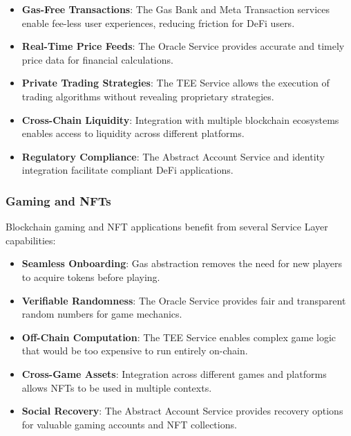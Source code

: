 \documentclass{article}
\begin{document}
\begin{itemize}
    \item \textbf{Gas-Free Transactions}: The Gas Bank and Meta Transaction services enable fee-less user experiences, reducing friction for DeFi users.
    
    \item \textbf{Real-Time Price Feeds}: The Oracle Service provides accurate and timely price data for financial calculations.
    
    \item \textbf{Private Trading Strategies}: The TEE Service allows the execution of trading algorithms without revealing proprietary strategies.
    
    \item \textbf{Cross-Chain Liquidity}: Integration with multiple blockchain ecosystems enables access to liquidity across different platforms.
    
    \item \textbf{Regulatory Compliance}: The Abstract Account Service and identity integration facilitate compliant DeFi applications.
\end{itemize}

\subsubsection{Gaming and NFTs}
\label{subsubsec:gaming-nfts}

Blockchain gaming and NFT applications benefit from several Service Layer capabilities:

\begin{itemize}
    \item \textbf{Seamless Onboarding}: Gas abstraction removes the need for new players to acquire tokens before playing.
    
    \item \textbf{Verifiable Randomness}: The Oracle Service provides fair and transparent random numbers for game mechanics.
    
    \item \textbf{Off-Chain Computation}: The TEE Service enables complex game logic that would be too expensive to run entirely on-chain.
    
    \item \textbf{Cross-Game Assets}: Integration across different games and platforms allows NFTs to be used in multiple contexts.
    
    \item \textbf{Social Recovery}: The Abstract Account Service provides recovery options for valuable gaming accounts and NFT collections.
\end{itemize}
\end{document}
